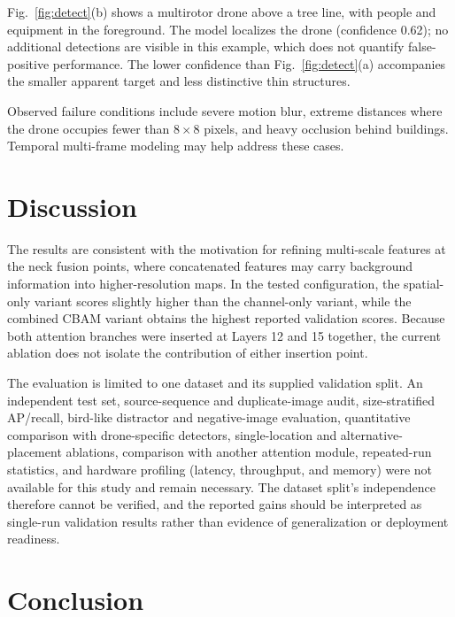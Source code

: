\documentclass[conference]{IEEEtran}
\begin{document}
Fig.~\ref{fig:detect}(b) shows a multirotor drone above a tree line, with people and equipment in the foreground. The model localizes the drone (confidence 0.62); no additional detections are visible in this example, which does not quantify false-positive performance. The lower confidence than Fig.~\ref{fig:detect}(a) accompanies the smaller apparent target and less distinctive thin structures.

Observed failure conditions include severe motion blur, extreme distances where the drone occupies fewer than $8\times8$ pixels, and heavy occlusion behind buildings. Temporal multi-frame modeling may help address these cases.

\section{Discussion}

The results are consistent with the motivation for refining multi-scale features at the neck fusion points, where concatenated features may carry background information into higher-resolution maps. In the tested configuration, the spatial-only variant scores slightly higher than the channel-only variant, while the combined CBAM variant obtains the highest reported validation scores. Because both attention branches were inserted at Layers 12 and 15 together, the current ablation does not isolate the contribution of either insertion point.

The evaluation is limited to one dataset and its supplied validation split. An independent test set, source-sequence and duplicate-image audit, size-stratified AP/recall, bird-like distractor and negative-image evaluation, quantitative comparison with drone-specific detectors, single-location and alternative-placement ablations, comparison with another attention module, repeated-run statistics, and hardware profiling (latency, throughput, and memory) were not available for this study and remain necessary. The dataset split's independence therefore cannot be verified, and the reported gains should be interpreted as single-run validation results rather than evidence of generalization or deployment readiness.

\section{Conclusion}
\end{document}

